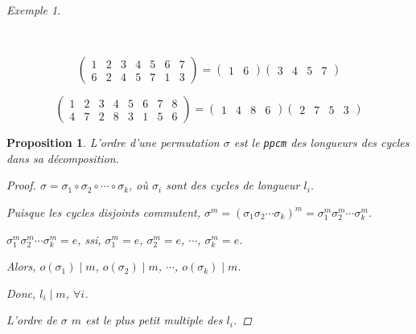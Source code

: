 \documentclass{report}
\newtheorem*{prop}{Proposition}
\theoremstyle{definition}
\theoremstyle{remark}
\newtheorem*{exem}{Exemple}
\begin{document}
	\begin{exem}
		\begin{ulist}~

			\item \[
			\begin{pmatrix}
				1&2&3&4&5&6&7\\
				6&2&4&5&7&1&3
			\end{pmatrix} = \begin{pmatrix}
				1&6
			\end{pmatrix} \begin{pmatrix}
				3&4&5&7
			\end{pmatrix}
			\]
			\item \[
			\begin{pmatrix}
				1&2&3&4&5&6&7&8\\
				4&7&2&8&3&1&5&6
			\end{pmatrix} = \begin{pmatrix}
				1&4&8&6
			\end{pmatrix} \begin{pmatrix}
				2&7&5&3
			\end{pmatrix}
			\]
		\end{ulist}
	\end{exem}
	\begin{prop}
		L'ordre d'une permutation $\sigma$ est le \verb|ppcm| des longueurs des cycles dans sa d\'ecomposition.
		\begin{proof}
			$\sigma = \sigma_1 \circ \sigma_2 \circ \dotsb \circ \sigma_k$, o\`u $\sigma_i$ sont des cycles de longueur $l_i$.

			Puisque les cycles disjoints commutent, $\sigma^m = (\sigma_1 \sigma_2 \dotsb \sigma_k)^m = \sigma_1^m \sigma_2^m \dotsb \sigma_k^m$.

			$\sigma_1^m \sigma_2^m \dotsb \sigma_k^m = e$, ssi, $\sigma_1^m=e$, $\sigma_2^m=e$, $\dotsb$, $\sigma_k^m=e$.

			Alors, $o(\sigma_1) \mid m$, $o(\sigma_2) \mid m$, $\dotsb$, $o(\sigma_k) \mid m$.

			Donc, $l_i \mid m$, $\forall i$.

			L'ordre de $\sigma$ $m$ est le plus petit multiple des $l_i$.
		\end{proof}
	\end{prop}
\end{document}
